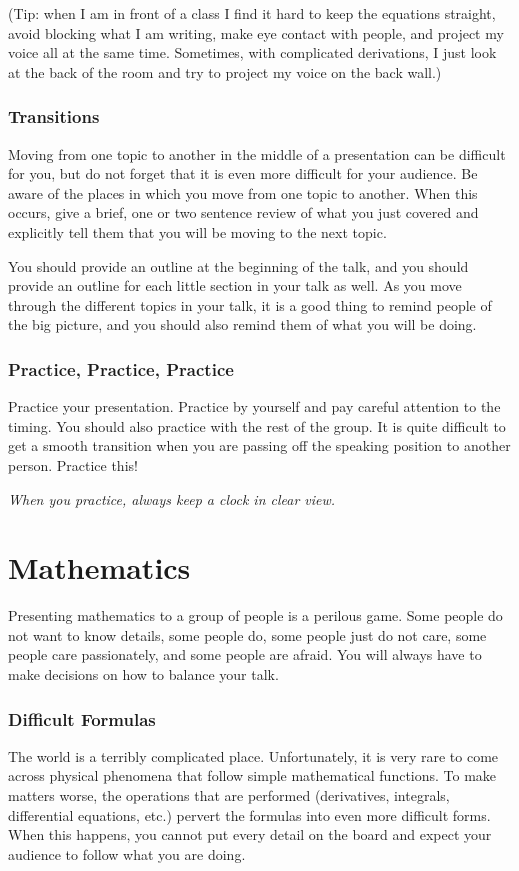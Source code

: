 (Tip: when I am in front of a class I find it hard to keep
the equations straight, avoid blocking what I am writing, make eye
contact with people, and project my voice all at the same time.
Sometimes, with complicated derivations, I just look at the back of
the room and try to project my voice on the back wall.)

\subsubsection{Transitions} Moving from one topic to another in the
middle of a presentation can be difficult for you, but do not forget
that it is even more difficult for your audience. Be aware of the
places in which you move from one topic to another. When this occurs,
give a brief, one or two sentence review of what you just covered and
explicitly tell them that you will be moving to the next topic.

You should provide an outline at the beginning of the talk, and you
should provide an outline for each little section in your talk as
well. As you move through the different topics in your talk, it is a
good thing to remind people of the big picture, and you should also
remind them of what you will be doing.

\subsubsection{Practice, Practice, Practice}
Practice your presentation. Practice by yourself and pay careful
attention to the timing. You should also practice with the rest of the
group. It is quite difficult to get a smooth transition when you are
passing off the speaking position to another person. Practice this!

\textit{When you practice, always keep a clock in clear view.}


\section{Mathematics}
Presenting mathematics to a group of people is a perilous game.
 Some people do not want to know
details, some people do, some people just do not care, some people
care passionately, and some people are afraid. You will always have to
make decisions on how to balance your talk.

\subsubsection{Difficult Formulas} The world is a terribly complicated
place. Unfortunately, it is very rare to come across physical phenomena
that follow simple mathematical functions. To make matters worse, the
operations that are performed (derivatives, integrals, differential
equations, etc.) pervert the formulas into even more difficult forms.
When this happens, you cannot put every detail on the board and expect
your audience to follow what you are doing.


